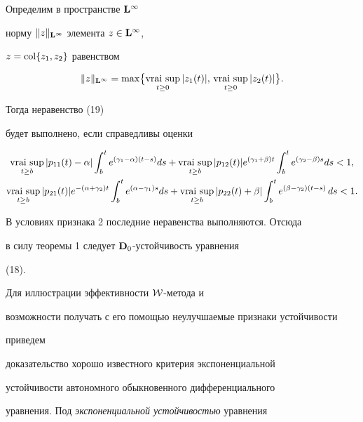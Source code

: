 \begin{pf}
Определим в пространстве $\bold L^\infty$


норму $\|z\|_{\bold L^\infty}$ элемента $z\in\bold L^\infty$,


$z=\operatorname{col}\{z_1, z_2\}$ равенством


$$


\|z\|_{\bold L^\infty}=\max\bigl\{\vraisup_{t\ge 0}|z_1(t)|,\,


\vraisup_{t\ge 0}|z_2(t)|\bigr\}.


$$


Тогда неравенство (19)


будет выполнено, если справедливы оценки


\begin{gather*}


\vraisup_{t\ge b}|p_{11}(t)-\alpha|\int_b^te^{(\gamma_1-\alpha)(t-s)}ds


+ \vraisup_{t\ge b}|p_{12}(t)|e^{(\gamma_1 + \beta)t}


\int_b^te^{(\gamma_2-\beta)s}ds < 1,\\


%


\vraisup_{t\ge b}|p_{21}(t)|e^{-(\alpha+\gamma_2)t}


\int_b^te^{(\alpha - \gamma_1)s}ds+


\vraisup_{t\ge b}|p_{22}(t)+\beta|\int_b^t


e^{(\beta-\gamma_2)(t-s)}\,ds<1.


\end{gather*}





В условиях признака 2 последние неравенства выполняются. Отсюда


в силу теоремы 1 следует $\bold D_0$-устойчивость уравнения


(18).


\end{pf}





Для иллюстрации эффективности $\cal W$-метода и


возможности получать с его помощью неулучшаемые признаки устойчивости


приведем


доказательство хорошо известного критерия экспоненциальной


устойчивости автономного обыкновенного дифференциального


уравнения. Под {\it экспоненциальной устойчивостью} уравнения


